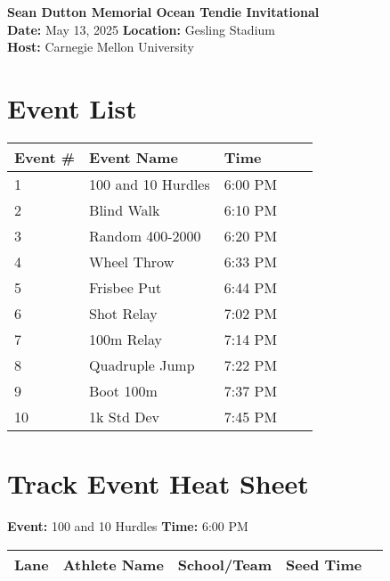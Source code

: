 \documentclass[11pt]{article}
\begin{document}
\begin{center}
    \LARGE \textbf{Sean Dutton Memorial Ocean Tendie Invitational} \\
    \large
    \vspace{0.5em}
    \textbf{Date:} May 13, 2025 \hspace{2cm} \textbf{Location:} Gesling Stadium \\
    \textbf{Host:} Carnegie Mellon University
\end{center}

\vspace{1em}

\section*{Event List}

\begin{tabular}{@{}lllll@{}}
\toprule
\textbf{Event \#} & \textbf{Event Name} &  \textbf{Time} \\
\midrule
1 & 100 and 10 Hurdles & 6:00 PM \\
2 & Blind Walk & 6:10 PM \\
3 & Random 400-2000 & 6:20 PM \\
4 & Wheel Throw & 6:33 PM \\
5 & Frisbee Put & 6:44 PM \\
6 & Shot Relay & 7:02 PM \\
7 & 100m Relay & 7:14 PM \\
8 & Quadruple Jump & 7:22 PM \\
9 & Boot 100m & 7:37 PM \\
10 & 1k Std Dev & 7:45 PM \\
\bottomrule
\end{tabular}



\vspace{2em}

\section*{Track Event Heat Sheet}


\textbf{Event:} 100 and 10 Hurdles \quad \textbf{Time:} 6:00 PM 

\vspace{1em}
\begin{tabular}{@{}lllll@{}}
\toprule
\textbf{Lane} & \textbf{Athlete Name} & \textbf{School/Team} & \textbf{Seed Time} \\
\midrule

\bottomrule
\end{tabular}
\vspace{2.5em}
\end{document}
